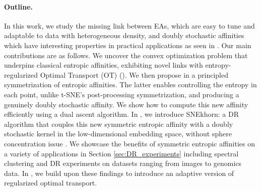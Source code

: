 \paragraph{Outline.} In this work, we study the missing
link between EAs, which are easy to tune and adaptable to data with heterogeneous density, and doubly stochastic affinities which have interesting properties in practical applications as seen in . 
Our main contributions are as follows. We uncover the convex
optimization problem that underpins classical entropic affinities, exhibiting
novel links with entropy-regularized Optimal Transport (OT) (). We then propose in  a principled symmetrization of entropic
affinities. The latter enables controlling the entropy in each point, unlike
t-SNE's post-processing symmetrization, and producing a genuinely doubly stochastic affinity. We show how to
compute this new affinity efficiently using a dual ascent algorithm.
In , we introduce SNEkhorn: a DR algorithm that couples this new symmetric entropic affinity with a doubly stochastic kernel in the low-dimensional embedding space, without sphere concentration issue \cite{lu2019doubly}. We showcase the benefits of symmetric entropic affinities on a variety of applications in Section \ref{sec:DR_experiments} including spectral clustering and DR experiments on datasets ranging from images to genomics data. In , we build upon these findings to introduce an adaptive version of regularized optimal transport.

